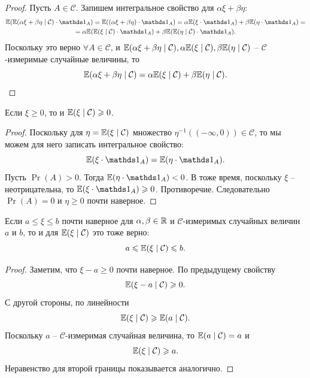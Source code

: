 \begin{proof}
    Пусть $A \in \mathcal{C}$. 
    Запишем интегральное свойство для $\alpha \xi + \beta \eta$:
    \begin{multline*}
        \Ex(\Ex(\alpha \xi + \beta \eta \mid \mathcal{C}) \cdot \Ind_{A}) = \Ex((\alpha \xi + \beta \eta) \cdot \Ind_{A}) = \alpha \Ex(\xi \cdot \Ind_{A}) + \beta \Ex(\eta \cdot \Ind_{A}) = \\ = \alpha \Ex(\Ex(\xi \mid \mathcal{C}) \cdot \Ind_{A}) + \beta \Ex(\Ex(\eta \mid \mathcal{C}) \cdot \Ind_{A}).
    \end{multline*}
    Поскольку это верно $\forall A \in \mathcal{C}$, и $\mathbb{E}(\alpha\xi + \beta \eta \mid \mathcal{C}), \alpha\mathbb{E}(\xi \mid \mathcal{C}), \beta\mathbb{E}(\eta \mid \mathcal{C})$ -- $\mathcal{C}$-измеримые случайные величины, то
    \[
        \mathbb{E}(\alpha \xi + \beta \eta \mid \mathcal{C}) = \alpha \mathbb{E}(\xi \mid \mathcal{C}) + \beta \mathbb{E}(\eta \mid \mathcal{C}).
    \]
\end{proof}
\begin{property}
    Если $\xi \geq 0$, то и $\mathbb{E}(\xi \mid \mathcal{C}) \geqslant 0$.
\end{property}
\begin{proof}
    Поскольку для $\eta = \mathbb{E}(\xi \mid \mathcal{C})$ множество $\eta^{-1}((-\infty, 0)) \in \mathcal{C}$, то мы можем для него записать интегральное свойство:
    \[
        \Ex(\xi \cdot \Ind_{A}) = \Ex(\eta \cdot \Ind_{A}).
    \]
    Пусть $\Pr(A) > 0$. Тогда $\Ex(\eta \cdot \Ind_{A}) < 0$. В тоже время, поскольку $\xi$ -- неотрицательна, то $\Ex(\xi \cdot \Ind_{A}) \geq 0$. Противоречие. Следовательно $\Pr(A) = 0$ и $\eta \geq 0$ почти наверное.
\end{proof}
\begin{corollary}
    Если $a \leq \xi \leq b$ почти наверное для $\alpha, \beta \in \mathbb{R}$ и $\mathcal{C}$-измеримых случайных величин $a$ и $b$, то и для $\mathbb{E}(\xi \mid \mathcal{C})$ это тоже верно:
    \[
        a \leqslant \mathbb{E}(\xi \mid \mathcal{C}) \leqslant b.
    \]
\end{corollary}
\begin{proof}
    Заметим, что $\xi - a \geq 0$ почти наверное. По предыдущему свойству 
    \[
        \mathbb{E}(\xi - a \mid \mathcal{C}) \geqslant 0.
    \]
    С другой стороны, по линейности 
    \[
        \mathbb{E}(\xi \mid \mathcal{C}) \geqslant \mathbb{E}(a \mid \mathcal{C}).
    \]    
    Поскольку $a$ -- $\mathcal{C}$-измеримая случайная величина, то $\mathbb{E}(a \mid \mathcal{C}) = a$ и 
    \[
        \mathbb{E}(\xi \mid \mathcal{C}) \geqslant a.
    \]
    Неравенство для второй границы показывается аналогично.
\end{proof}
